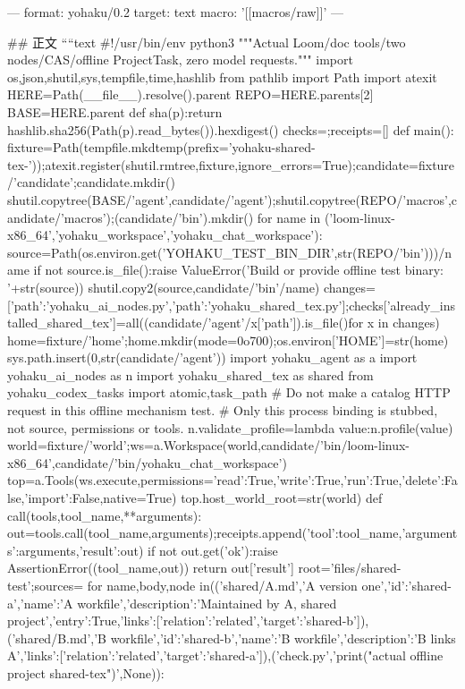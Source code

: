 ---
format: yohaku/0.2
target: text
macro: '[[macros/raw]]'
---

## 正文
````text
#!/usr/bin/env python3
"""Actual Loom/doc tools/two nodes/CAS/offline ProjectTask, zero model requests."""
import os,json,shutil,sys,tempfile,time,hashlib
from pathlib import Path
import atexit
HERE=Path(__file__).resolve().parent
REPO=HERE.parents[2]
BASE=HERE.parent
def sha(p):return hashlib.sha256(Path(p).read_bytes()).hexdigest()
checks={};receipts=[]
def main():
    fixture=Path(tempfile.mkdtemp(prefix='yohaku-shared-tex-'));atexit.register(shutil.rmtree,fixture,ignore_errors=True);candidate=fixture/'candidate';candidate.mkdir()
    shutil.copytree(BASE/'agent',candidate/'agent');shutil.copytree(REPO/'macros',candidate/'macros');(candidate/'bin').mkdir()
    for name in ('loom-linux-x86_64','yohaku_workspace','yohaku_chat_workspace'):
        source=Path(os.environ.get('YOHAKU_TEST_BIN_DIR',str(REPO/'bin')))/name
        if not source.is_file():raise ValueError('Build or provide offline test binary: '+str(source))
        shutil.copy2(source,candidate/'bin'/name)
    changes=[{'path':'yohaku_ai_nodes.py'},{'path':'yohaku_shared_tex.py'}];checks['already_installed_shared_tex']=all((candidate/'agent'/x['path']).is_file()for x in changes)
    home=fixture/'home';home.mkdir(mode=0o700);os.environ['HOME']=str(home)
    sys.path.insert(0,str(candidate/'agent'))
    import yohaku_agent as a
    import yohaku_ai_nodes as n
    import yohaku_shared_tex as shared
    from yohaku_codex_tasks import atomic,task_path
    # Do not make a catalog HTTP request in this offline mechanism test.
    # Only this process binding is stubbed, not source, permissions or tools.
    n.validate_profile=lambda value:n.profile(value)
    world=fixture/'world';ws=a.Workspace(world,candidate/'bin/loom-linux-x86_64',candidate/'bin/yohaku_chat_workspace')
    top=a.Tools(ws.execute,permissions={'read':True,'write':True,'run':True,'delete':False,'import':False},native=True)
    top.host_world_root=str(world)
    def call(tools,tool_name,**arguments):
        out=tools.call(tool_name,arguments);receipts.append({'tool':tool_name,'arguments':arguments,'result':out})
        if not out.get('ok'):raise AssertionError((tool_name,out))
        return out['result']
    root='files/shared-test';sources={}
    for name,body,node in(('shared/A.md','A version one\n',{'id':'shared-a','name':'A workfile','description':'Maintained by A, shared project','entry':True,'links':[{'relation':'related','target':'shared-b'}]}),('shared/B.md','B workfile\n',{'id':'shared-b','name':'B workfile','description':'B links A','links':[{'relation':'related','target':'shared-a'}]}),('check.py','print("actual offline project shared-tex")\n',None)):
